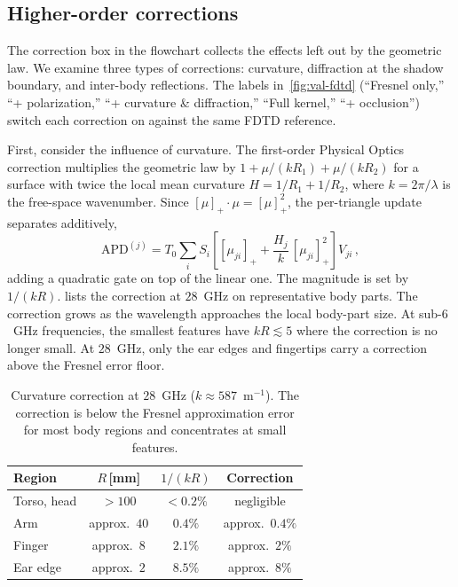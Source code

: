 \documentclass[journal,twocolumn,10pt]{IEEEtran}
\newcommand{\APD}{\mathrm{APD}}
\newcommand{\pospart}[1]{\left[#1\right]_{+}}
\begin{document}
\subsection{Higher-order corrections}\label{subsec:corr-residuals}

The correction box in the flowchart collects the effects left out by
the geometric law. We examine three types of corrections: curvature,
diffraction at the shadow boundary, and inter-body reflections. The
labels in~\cref{fig:val-fdtd} (``Fresnel only,'' ``+ polarization,'' ``+
curvature \& diffraction,'' ``Full kernel,'' ``+ occlusion'') switch
each correction on against the same FDTD reference.

First, consider the influence of curvature. The first-order Physical
Optics correction multiplies the geometric law by
$1 + \mu/(kR_1) + \mu/(kR_2)$ for a surface with twice the local mean
curvature $H = 1/R_1 + 1/R_2$, where $k = 2\pi/\lambda$ is the
free-space wavenumber. Since
$\pospart{\mu}\cdot\mu = \pospart{\mu}^2$, the per-triangle update
separates additively,
\begin{equation}\label{eq:curv-update}
  \APD^{(j)} = T_0 \sum_i S_i\!\left[
  \pospart{\mu_{ji}} + \frac{H_j}{k}\,\pospart{\mu_{ji}}^2 \right]
  V_{ji}\, ,
\end{equation}
adding a quadratic gate on top of the linear one. The magnitude is
set by $1/(kR)$.  lists the correction at
$28$~GHz on representative body parts. The correction grows as the
wavelength approaches the local body-part size. At sub-$6$~GHz
frequencies, the smallest features have $kR \lesssim 5$ where the
correction is no longer small. At $28$~GHz, only the ear edges and
fingertips carry a correction above the Fresnel error floor.

\begin{table}[!t]
\centering
\caption{Curvature correction at $28$~GHz ($k \approx 587$~m$^{-1}$).
The correction is below the Fresnel approximation error for most
body regions and concentrates at small features.}
\label{tab:curv-mag}
\begin{tabular}{lccc}
\toprule
Region & $R$\,[mm] & $1/(kR)$ & Correction \\
\midrule
Torso, head & $> 100$ & $< 0.2\%$ & negligible \\
Arm         & approx.\ $40$ & $0.4\%$ & approx.\ $0.4\%$ \\
Finger      & approx.\ $8$  & $2.1\%$ & approx.\ $2\%$ \\
Ear edge    & approx.\ $2$  & $8.5\%$ & approx.\ $8\%$ \\
\bottomrule
\end{tabular}
\end{table}
\end{document}
